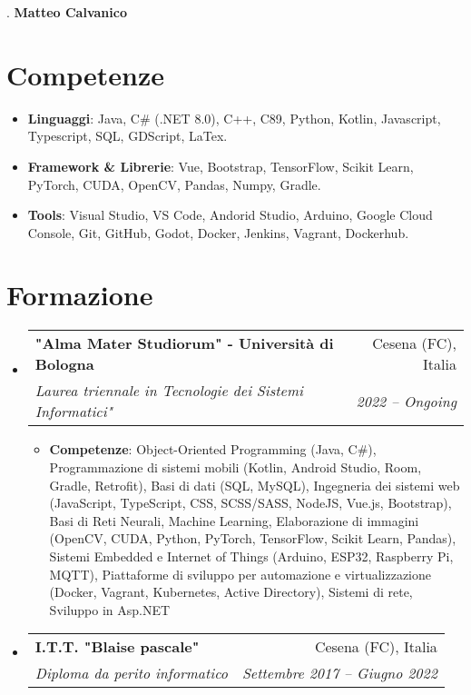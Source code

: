 \documentclass[letterpaper,11pt]{article}
\makeatletter
\newcommand{\resumeItem}[2]{
  \item\small{
    \textbf{#1}{: #2 \vspace{-2pt}}
  }
}
\newcommand{\resumeSubheading}[4]{
  \vspace{-1pt}\item
    \begin{tabular*}{0.97\textwidth}{l@{\extracolsep{\fill}}r}
      \textbf{#1} & #2 \\
      \textit{\small#3} & \textit{\small #4} \\
    \end{tabular*}\vspace{-5pt}
}
\newcommand{\resumeSubHeadingListStart}{\begin{itemize}[leftmargin=*]}
\newcommand{\resumeSubHeadingListEnd}{\end{itemize}}
\newcommand{\resumeItemListStart}{\begin{itemize}}
\newcommand{\resumeItemListEnd}{\end{itemize}\vspace{-5pt}}
\makeatother
\begin{document}
\setlength{\footskip}{5pt}.
\centering\textbf{\Large Matteo Calvanico} \\
  \vspace{0.25in}

\section{Competenze}
\resumeSubHeadingListStart
  \item{
    \textbf{Linguaggi}{: Java, C\# (.NET 8.0), C++, C89, Python, Kotlin, Javascript, Typescript, SQL, GDScript, LaTex.}
    \hfill
    }
  \item{
    \textbf{Framework \& Librerie}{: Vue, Bootstrap, TensorFlow, Scikit Learn, PyTorch, CUDA, OpenCV, Pandas, Numpy, Gradle.}
    \hfill
    }
  \item{
    \textbf{Tools}{: Visual Studio, VS Code, Andorid Studio, Arduino, Google Cloud Console, Git, GitHub, Godot, Docker, Jenkins, Vagrant, Dockerhub.}
    \hfill
    }
  \resumeSubHeadingListEnd

\section{Formazione}
  \resumeSubHeadingListStart
    \resumeSubheading
      {"Alma Mater Studiorum" - Università di Bologna}{Cesena (FC), Italia}
      {Laurea triennale in Tecnologie dei Sistemi Informatici"}{2022 -- Ongoing}
      \resumeItemListStart
          \resumeItem{Competenze}{Object-Oriented Programming (Java, C\#), Programmazione di sistemi mobili (Kotlin, Android Studio, Room, Gradle, Retrofit), Basi di dati (SQL, MySQL), Ingegneria dei sistemi web (JavaScript, TypeScript, CSS, SCSS/SASS, NodeJS, Vue.js, Bootstrap), Basi di Reti Neurali, Machine Learning, Elaborazione di immagini (OpenCV, CUDA, Python, PyTorch, TensorFlow, Scikit Learn, Pandas), 
          Sistemi Embedded e Internet of Things (Arduino, ESP32, Raspberry Pi, MQTT), Piattaforme di sviluppo per automazione e virtualizzazione (Docker, Vagrant, Kubernetes, Active Directory), Sistemi di rete, Sviluppo in Asp.NET}
      \resumeItemListEnd
    \resumeSubheading
      {I.T.T. "Blaise pascale"}{Cesena (FC), Italia}
      {Diploma da perito informatico}{Settembre 2017 -- Giugno 2022}
  \resumeSubHeadingListEnd
\end{document}
